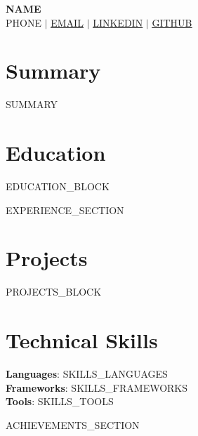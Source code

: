 \documentclass[letterpaper,11pt]{article}
\newcommand{\resumeSubHeadingListStart}{\begin{itemize}[leftmargin=0.15in, label={}]}
\newcommand{\resumeSubHeadingListEnd}{\end{itemize}}
\begin{document}
\begin{center}
    \textbf{\Huge \scshape {{NAME}}} \\ \vspace{1pt}
    \small {{PHONE}} $|$
    \href{mailto:{{EMAIL}}}{\underline{{{EMAIL}}}} $|$
    \href{{{LINKEDIN}}}{\underline{{{LINKEDIN}}}} $|$
    \href{{{GITHUB}}}{\underline{{{GITHUB}}}}
\end{center}

\section{Summary}
\small{{SUMMARY}}

\section{Education}
\resumeSubHeadingListStart
{{EDUCATION_BLOCK}}
\resumeSubHeadingListEnd

{{EXPERIENCE_SECTION}}

\section{Projects}
\resumeSubHeadingListStart
{{PROJECTS_BLOCK}}
\resumeSubHeadingListEnd

\section{Technical Skills}
\begin{itemize}[leftmargin=0.15in, label={}]
  \small{\item{
    \textbf{Languages}{: {{SKILLS_LANGUAGES}}} \\
    \textbf{Frameworks}{: {{SKILLS_FRAMEWORKS}}} \\
    \textbf{Tools}{: {{SKILLS_TOOLS}}}
  }}
\end{itemize}

{{ACHIEVEMENTS_SECTION}}
\end{document}
